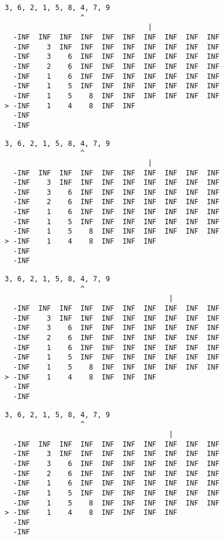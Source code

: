 { \begin{verbatim}
3, 6, 2, 1, 5, 8, 4, 7, 9
                  ^
                                  |
  -INF  INF  INF  INF  INF  INF  INF  INF  INF  INF
  -INF    3  INF  INF  INF  INF  INF  INF  INF  INF
  -INF    3    6  INF  INF  INF  INF  INF  INF  INF
  -INF    2    6  INF  INF  INF  INF  INF  INF  INF
  -INF    1    6  INF  INF  INF  INF  INF  INF  INF
  -INF    1    5  INF  INF  INF  INF  INF  INF  INF
  -INF    1    5    8  INF  INF  INF  INF  INF  INF
> -INF    1    4    8  INF  INF                    
  -INF                                             
  -INF                                             
\end{verbatim} }

{ \begin{verbatim}
3, 6, 2, 1, 5, 8, 4, 7, 9
                  ^
                                  |
  -INF  INF  INF  INF  INF  INF  INF  INF  INF  INF
  -INF    3  INF  INF  INF  INF  INF  INF  INF  INF
  -INF    3    6  INF  INF  INF  INF  INF  INF  INF
  -INF    2    6  INF  INF  INF  INF  INF  INF  INF
  -INF    1    6  INF  INF  INF  INF  INF  INF  INF
  -INF    1    5  INF  INF  INF  INF  INF  INF  INF
  -INF    1    5    8  INF  INF  INF  INF  INF  INF
> -INF    1    4    8  INF  INF  INF               
  -INF                                             
  -INF                                             
\end{verbatim} }

{ \begin{verbatim}
3, 6, 2, 1, 5, 8, 4, 7, 9
                  ^
                                       |
  -INF  INF  INF  INF  INF  INF  INF  INF  INF  INF
  -INF    3  INF  INF  INF  INF  INF  INF  INF  INF
  -INF    3    6  INF  INF  INF  INF  INF  INF  INF
  -INF    2    6  INF  INF  INF  INF  INF  INF  INF
  -INF    1    6  INF  INF  INF  INF  INF  INF  INF
  -INF    1    5  INF  INF  INF  INF  INF  INF  INF
  -INF    1    5    8  INF  INF  INF  INF  INF  INF
> -INF    1    4    8  INF  INF  INF               
  -INF                                             
  -INF                                             
\end{verbatim} }

{ \begin{verbatim}
3, 6, 2, 1, 5, 8, 4, 7, 9
                  ^
                                       |
  -INF  INF  INF  INF  INF  INF  INF  INF  INF  INF
  -INF    3  INF  INF  INF  INF  INF  INF  INF  INF
  -INF    3    6  INF  INF  INF  INF  INF  INF  INF
  -INF    2    6  INF  INF  INF  INF  INF  INF  INF
  -INF    1    6  INF  INF  INF  INF  INF  INF  INF
  -INF    1    5  INF  INF  INF  INF  INF  INF  INF
  -INF    1    5    8  INF  INF  INF  INF  INF  INF
> -INF    1    4    8  INF  INF  INF  INF          
  -INF                                             
  -INF                                             
\end{verbatim} }

